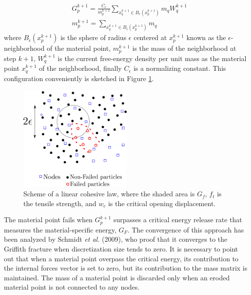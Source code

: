 \message{ !name(2020_EFM_MPM_Eigensoftening.tex)}\documentclass[preprint,12pt,a4paper]{elsarticle}
\begin{document}
\begin{align}
  \label{eq:energy-release-EE}
&G_p^{k+1} = \frac{C_{\epsilon}}{m_p^{k+1}}  \sum_{x_q^{k+1} \in
  B_{\epsilon}(x_p^{k+1})} m_q W_q^{k+1}\\
&m_p^{k+1} =  \sum_{x_q^{k+1} \in
  B_{\epsilon}(x_p^{k+1})} m_q  
\end{align}
where $B_{\epsilon}(x_p^{k+1})$ is the sphere of radius $\epsilon$
centered at $x_p^{k+1}$ known as the $\epsilon$-neighborhood of the
material point, $m_p^{k+1}$ is the mass of the neighborhood at step
$k+1$, $W_q^{k+1}$ is the current free-energy density per unit mass as
the material point $x_q^{k+1}$ of the neighborhood, finally
$C_{\epsilon}$ is a normalizing constant. This configuration
conveniently is sketched in Figure \ref{fig:Failed-particles}.
\begin{figure}
  \centering
  \includegraphics[width=0.5\textwidth]{Figures/Particle-failed}
  \caption{Scheme of a linear cohesive law, where the shaded area is
    $G_f$, $f_t$ is the tensile strength, and $w_c$ is the critical
    opening displacement.}
  \label{fig:Failed-particles}
\end{figure}
The material point fails when $G_p^{k+1}$ surpasses a critical energy
release rate that measures the material-specific energy, $G_F$. The
convergence of this approach has been analyzed by Schmidt {\it et al.}
(2009)\cite{Schmidt_2009}, who proof that it converges to the Griffith
fracture when discretization size tends to zero. It is necessary to
point out that when a material point overpass the critical energy, its
contribution to the internal forces vector  is set to zero, but its
contribution to the mass matrix is maintained. The mass of a material
point is discarded only when an eroded material point is not connected
to any nodes.\\
\end{document}
